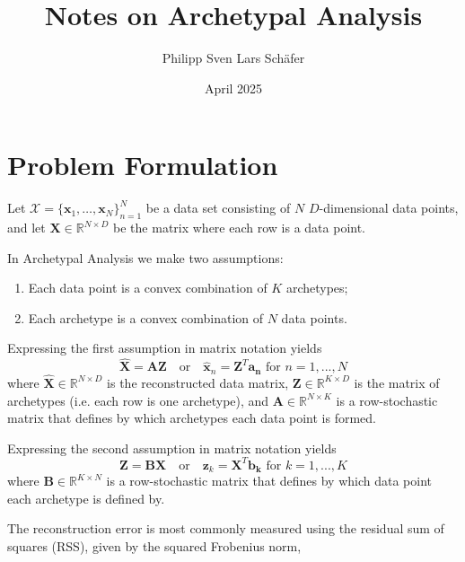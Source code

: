 \documentclass[oneside]{article}
\title{Notes on Archetypal Analysis}
\author{Philipp Sven Lars Schäfer}
\date{April 2025}
\begin{document}
\maketitle

\section{Problem Formulation}

Let $\mathcal{X}=\{\mathbf{x}_1, \ldots, \mathbf{x}_N\}_{n=1}^N$ be a data set consisting of $N$ $D$-dimensional data points, and let $\mathbf{X} \in \mathbb{R}^{N \times D}$ be the matrix where each row is a data point.

In Archetypal Analysis we make two assumptions:
\begin{enumerate}
    \item Each data point is a convex combination of $K$ archetypes;
    \item Each archetype is a convex combination of $N$ data points.
\end{enumerate}

Expressing the first assumption in matrix notation yields
\begin{equation}
\label{eq:first-assumption}
\hat{\mathbf{X}} = \mathbf{A} \mathbf{Z} \quad \text{or} \quad \hat{\mathbf{x}}_n = \mathbf{Z}^T \mathbf{a_n} \text{ for } n = 1, ..., N
\end{equation}
where $\hat{\mathbf{X}} \in \mathbb{R}^{N \times D}$ is the reconstructed data matrix, $\mathbf{Z} \in \mathbb{R}^{K \times D}$ is the matrix of archetypes (i.e. each row is one archetype), and $\mathbf{A} \in \mathbb{R}^{N \times K}$ is a row-stochastic matrix that defines by which archetypes each data point is formed.

Expressing the second assumption in matrix notation yields
\begin{equation}
\label{eq:second-assumption}
\mathbf{Z} = \mathbf{B} \mathbf{X} \quad \text{or} \quad \mathbf{z}_k = \mathbf{X}^T \mathbf{b_k} \text{ for } k = 1, ..., K
\end{equation}
where $\mathbf{B} \in \mathbb{R}^{K \times N}$ is a row-stochastic matrix that defines by which data point each archetype is defined by.

The reconstruction error is most commonly measured using the residual sum of squares (RSS), given by the squared Frobenius norm,
\end{document}
